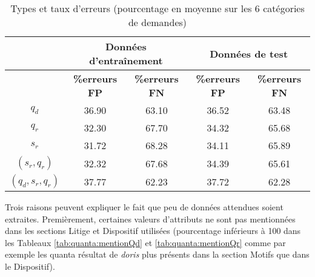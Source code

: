 \begin{table}[!htb]
	\centering\scriptsize
	\begin{tabular}{|c|c|c|c|c|}
		\hline
		      &    \multicolumn{2}{|c|}{Données d'entraînement}      &      \multicolumn{2}{|c|}{Données de test}       \\ \hline
		& \textbf{\%erreurs FP} & \textbf{\%erreurs FN} & \textbf{\%erreurs FP} & \textbf{\%erreurs FN} \\ \hline
		$q_d$            & 36.90                 & 63.10                 & 36.52                 & 63.48                 \\ \hline
		$q_r$            & 32.30                 & 67.70                 & 34.32                 & 65.68                 \\ \hline
		$s_r$            & 31.72                 & 68.28                 & 34.11                 & 65.89                 \\ \hline
		$(s_r, q_r)$     & 32.32                 & 67.68                 & 34.39                 & 65.61                 \\ \hline
		$(q_d,s_r, q_r)$ & 37.77                 & 62.23                 & 37.72                 & 62.28                 \\ \hline
	\end{tabular}
\caption{Types et taux d'erreurs (pourcentage en moyenne sur les 6 catégories de demandes)} \label{tab:quanta:types_erreurs}
\end{table}

Trois raisons peuvent expliquer le fait que  peu de données attendues soient extraites. Premièrement, certaines valeurs d'attributs ne sont pas mentionnées dans les sections Litige et Dispositif utilisées (pourcentage inférieurs à 100 dans les Tableaux \ref{tab:quanta:mentionQd} et \ref{tab:quanta:mentionQr} comme par exemple les quanta résultat de \textit{doris} plus présents dans la section Motifs que dans le Dispositif).


